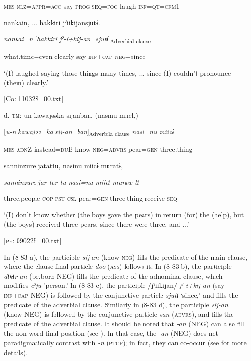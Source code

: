       \textsc{mes}-\textsc{nlz}=\textsc{appr}=\textsc{acc}  say-\textsc{prog}-\textsc{seq}=\textsc{foc}  laugh-\textsc{inf}=\textsc{qt}=\textsc{cfm}1

      {\textbar}nankai{\textbar}n, ...  {\textbar}hakkiri{\textbar}  jˀiikijansjutɨ.

      \textit{nankai=n}  [\textit{hakkiri}  \textit{jˀ-i+kij-an=sjutɨ}]\textsubscript{Adverbial clause}

      what.time=even  clearly  say-\textsc{inf}+\textsc{cap}-\textsc{neg}=since

      ‘(I) laughed saying those things many times, ... since (I) couldn’t pronounce (them) clearly.’

      [Co: 110328\_00.txt]

  d.  \textsc{tm}:  un  kawajəəka  sijanban,  (nasinu  miicɨ,)

      [\textit{u-n}  \textit{kawajəə=ka}  \textit{sij-an=ban}]\textsubscript{Adverbila clause}  \textit{nasi=nu}  \textit{miicɨ}

      \textsc{mes}-\textsc{adn}Z  instead=\textsc{du}B  know-\textsc{neg}=\textsc{advrs}  pear=\textsc{gen}  three.thing

      {\textbar}sanninzure{\textbar}  jatattu,  nasinu  miicɨ  muratɨ,

      \textit{sanninzure}  \textit{jar-tar-tu}  \textit{nasi=nu}  \textit{miicɨ}  \textit{muraw-tɨ}

      three.people  \textsc{cop}-\textsc{pst}-\textsc{csl}  pear=\textsc{gen}  three.thing  receive-\textsc{seq}

      ‘(I) don’t know whether (the boys gave the pears) in return (for) the (help), but (the boys) received three pears, since there were three, and ...’

      [\textsc{pf}: 090225\_00.txt]

In (8-83 a), the participle \textit{sij-an} (know-\textsc{neg}) fills the predicate of the main clause, where the clause-final particle \textit{doo} (\textsc{ass}) follows it. In (8-83 b), the participle \textit{dɨkɨr-an} (be.born-NEG) fills the predicate of the adnominal clause, which modifies \textit{cˀju} ‘person.’ In (8-83 c), the participle /jˀiikijan/ \textit{jˀ-i+kij-an} (say-\textsc{inf}+\textsc{cap}-NEG) is followed by the conjunctive particle \textit{sjutɨ} ‘since,’ and fills the predicate of the adverbial clause. Similarly in (8-83 d), the participle \textit{sij-an} (know-NEG) is followed by the conjunctive particle \textit{ban} (\textsc{advrs}), and fills the predicate of the adverbial clause. It should be noted that \textit{{}-an} (NEG) can also fill the non-word-final position (see ). In that case, the \textit{{}-an} (NEG) does not paradigmatically contrast with \textit{{}-n} (\textsc{ptcp}); in fact, they can co-occur (see  for more details).

